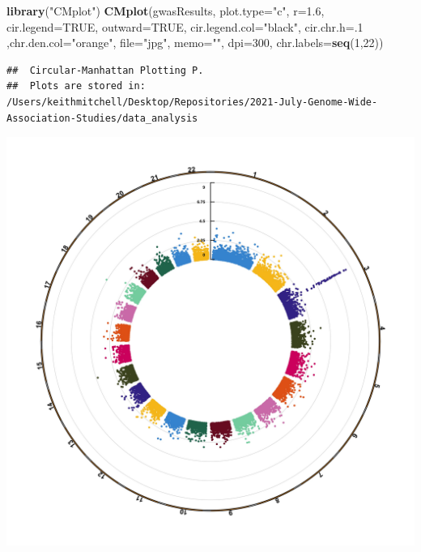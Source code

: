 \documentclass[
]{article}
\newenvironment{Shaded}{\begin{snugshade}}{\end{snugshade}}
\newcommand{\DataTypeTok}[1]{\textcolor[rgb]{0.13,0.29,0.53}{#1}}
\newcommand{\DecValTok}[1]{\textcolor[rgb]{0.00,0.00,0.81}{#1}}
\newcommand{\FloatTok}[1]{\textcolor[rgb]{0.00,0.00,0.81}{#1}}
\newcommand{\KeywordTok}[1]{\textcolor[rgb]{0.13,0.29,0.53}{\textbf{#1}}}
\newcommand{\NormalTok}[1]{#1}
\newcommand{\OtherTok}[1]{\textcolor[rgb]{0.56,0.35,0.01}{#1}}
\newcommand{\StringTok}[1]{\textcolor[rgb]{0.31,0.60,0.02}{#1}}
\begin{document}
\begin{Shaded}
\begin{Highlighting}[]
\KeywordTok{library}\NormalTok{(}\StringTok{"CMplot"}\NormalTok{)}
\KeywordTok{CMplot}\NormalTok{(gwasResults, }\DataTypeTok{plot.type=}\StringTok{"c"}\NormalTok{, }\DataTypeTok{r=}\FloatTok{1.6}\NormalTok{, }\DataTypeTok{cir.legend=}\OtherTok{TRUE}\NormalTok{,}
        \DataTypeTok{outward=}\OtherTok{TRUE}\NormalTok{, }\DataTypeTok{cir.legend.col=}\StringTok{"black"}\NormalTok{, }\DataTypeTok{cir.chr.h=}\NormalTok{.}\DecValTok{1}\NormalTok{ ,}\DataTypeTok{chr.den.col=}\StringTok{"orange"}\NormalTok{, }\DataTypeTok{file=}\StringTok{"jpg"}\NormalTok{,}
        \DataTypeTok{memo=}\StringTok{""}\NormalTok{, }\DataTypeTok{dpi=}\DecValTok{300}\NormalTok{, }\DataTypeTok{chr.labels=}\KeywordTok{seq}\NormalTok{(}\DecValTok{1}\NormalTok{,}\DecValTok{22}\NormalTok{))}
\end{Highlighting}
\end{Shaded}

\begin{verbatim}
##  Circular-Manhattan Plotting P.
##  Plots are stored in: /Users/keithmitchell/Desktop/Repositories/2021-July-Genome-Wide-Association-Studies/data_analysis
\end{verbatim}

\includegraphics{../Circular-Manhattan.P.jpg}
\end{document}
